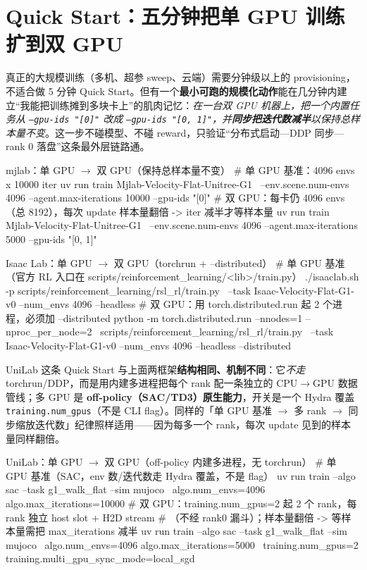 \section{Quick Start：五分钟把单 GPU 训练扩到双 GPU}
\label{sec:rlmc-ls-quickstart}

真正的大规模训练（多机、超参 sweep、云端）需要分钟级以上的 provisioning，不适合做 5 分钟 Quick Start。但有一个\textbf{最小可跑的规模化动作}能在几分钟内建立“我能把训练摊到多块卡上”的肌肉记忆：\emph{在一台双 GPU 机器上，把一个内置任务从 \texttt{--gpu-ids "[0]"} 改成 \texttt{--gpu-ids "[0, 1]"}，并\textbf{同步把迭代数减半}以保持总样本量不变}。这一步不碰模型、不碰 reward，只验证“分布式启动—DDP 同步—rank 0 落盘”这条最外层链路通。

\begin{codebox}[bash]{mjlab：单 GPU $\to$ 双 GPU（保持总样本量不变）}
# 单 GPU 基准：4096 envs x 10000 iter
uv run train Mjlab-Velocity-Flat-Unitree-G1 \
    --env.scene.num-envs 4096 --agent.max-iterations 10000 --gpu-ids "[0]"
# 双 GPU：每卡仍 4096 envs（总 8192），每次 update 样本量翻倍 -> iter 减半才等样本量
uv run train Mjlab-Velocity-Flat-Unitree-G1 \
    --env.scene.num-envs 4096 --agent.max-iterations 5000  --gpu-ids "[0, 1]"
\end{codebox}

\begin{codebox}[bash]{Isaac Lab：单 GPU $\to$ 双 GPU（torchrun + --distributed）}
# 单 GPU 基准（官方 RL 入口在 scripts/reinforcement_learning/<lib>/train.py）
./isaaclab.sh -p scripts/reinforcement_learning/rsl_rl/train.py \
    --task Isaac-Velocity-Flat-G1-v0 --num_envs 4096 --headless
# 双 GPU：用 torch.distributed.run 起 2 个进程，必须加 --distributed
python -m torch.distributed.run --nnodes=1 --nproc_per_node=2 \
    scripts/reinforcement_learning/rsl_rl/train.py \
    --task Isaac-Velocity-Flat-G1-v0 --num_envs 4096 --headless --distributed
\end{codebox}

UniLab 这条 Quick Start 与上面两框架\textbf{结构相同、机制不同}：它\emph{不走} torchrun/DDP，而是用内建多进程把每个 rank 配一条独立的 CPU$\to$GPU 数据管线；多 GPU 是 \textbf{off-policy（SAC/TD3）原生能力}，开关是一个 Hydra 覆盖 \verb|training.num_gpus|（不是 CLI flag）。同样的「单 GPU 基准 $\to$ 多 rank $\to$ 同步缩放迭代数」纪律照样适用——因为每多一个 rank，每次 update 见到的样本量同样翻倍。

\begin{codebox}[bash]{UniLab：单 GPU $\to$ 双 GPU（off-policy 内建多进程，无 torchrun）}
# 单 GPU 基准（SAC，env 数/迭代数走 Hydra 覆盖，不是 flag）
uv run train --algo sac --task g1_walk_flat --sim mujoco \
    algo.num_envs=4096 algo.max_iterations=10000
# 双 GPU：training.num_gpus=2 起 2 个 rank，每 rank 独立 host slot + H2D stream
#   （不经 rank0 漏斗）；样本量翻倍 -> 等样本量需把 max_iterations 减半
uv run train --algo sac --task g1_walk_flat --sim mujoco \
    algo.num_envs=4096 algo.max_iterations=5000 \
    training.num_gpus=2 training.multi_gpu_sync_mode=local_sgd
\end{codebox}

